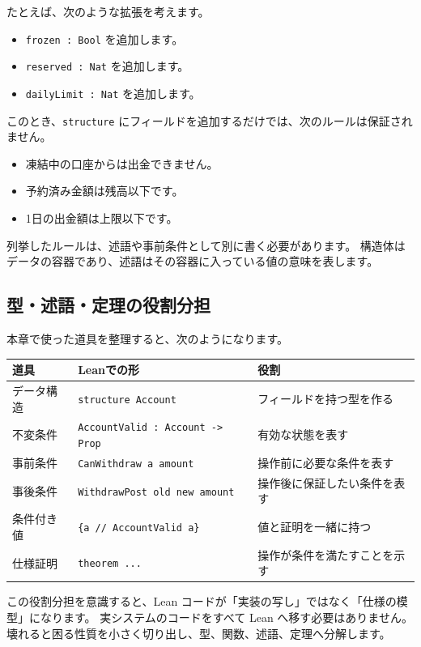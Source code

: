 たとえば、次のような拡張を考えます。

\begin{itemize}
\item \texttt{frozen : Bool} を追加します。
\item \texttt{reserved : Nat} を追加します。
\item \texttt{dailyLimit : Nat} を追加します。
\end{itemize}

このとき、\texttt{structure} にフィールドを追加するだけでは、次のルールは保証されません。

\begin{itemize}
\item 凍結中の口座からは出金できません。
\item 予約済み金額は残高以下です。
\item 1日の出金額は上限以下です。
\end{itemize}

列挙したルールは、述語や事前条件として別に書く必要があります。
構造体はデータの容器であり、述語はその容器に入っている値の意味を表します。

\subsection{型・述語・定理の役割分担}

本章で使った道具を整理すると、次のようになります。

\begin{center}
\begin{tabular}{lll}
\toprule
道具 & Leanでの形 & 役割 \\
\midrule
データ構造 & \texttt{structure Account} & フィールドを持つ型を作る \\
不変条件 & \texttt{AccountValid : Account -> Prop} & 有効な状態を表す \\
事前条件 & \texttt{CanWithdraw a amount} & 操作前に必要な条件を表す \\
事後条件 & \texttt{WithdrawPost old new amount} & 操作後に保証したい条件を表す \\
条件付き値 & \texttt{\{a // AccountValid a\}} & 値と証明を一緒に持つ \\
仕様証明 & \texttt{theorem ...} & 操作が条件を満たすことを示す \\
\bottomrule
\end{tabular}
\end{center}

この役割分担を意識すると、Lean コードが「実装の写し」ではなく「仕様の模型」になります。
実システムのコードをすべて Lean へ移す必要はありません。
壊れると困る性質を小さく切り出し、型、関数、述語、定理へ分解します。

